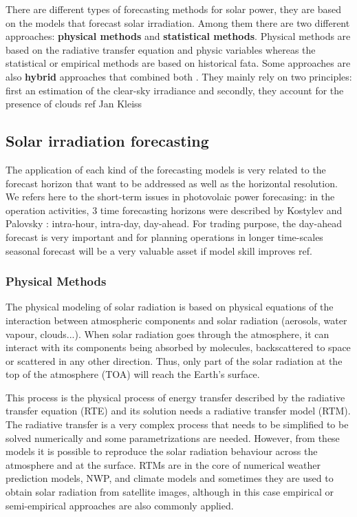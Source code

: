 There are different types of forecasting methods for solar power, they are based on the models that forecast solar irradiation. Among them there are two different approaches: \textbf{physical methods} and \textbf{statistical methods}. Physical methods are based on the radiative transfer equation and physic variables whereas the statistical or empirical methods are based on historical fata. Some approaches are also \textbf{hybrid} approaches that combined both \cite*{Diagne2013, Tovar-Pescador2008}. They mainly rely on two principles: first an estimation of the clear-sky irradiance and secondly, they account for the presence of clouds {ref Jan Kleiss}  


\subsection{Solar irradiation forecasting}

The application of each kind of the forecasting models is very related to the forecast horizon that want to be addressed as well as the horizontal resolution. We refers here to the short-term issues in photovolaic power forecasing: in the operation activities, 3 time forecasting horizons were described by Kostylev and Palovsky \cite*{kostylev2011solar}: intra-hour, intra-day, day-ahead. For trading purpose, the day-ahead forecast is very important and for planning operations in longer time-scales seasonal forecast will be a very valuable asset if model skill improves {ref}. 

\subsubsection{Physical Methods}

The physical modeling of solar radiation is based on physical equations of the interaction between atmospheric components and solar radiation (aerosols, water vapour, clouds...). When solar radiation goes through the atmosphere, it can interact with its components being absorbed by molecules, backscattered to space or scattered in any other direction. Thus, only part of the solar radiation at the top of the atmosphere (TOA) will reach the Earth's surface.

This process is the physical process of energy transfer described by the radiative transfer equation (RTE) and its solution needs a radiative transfer model (RTM). The radiative transfer is a very complex process that needs to be simplified to be solved numerically and some parametrizations are needed. However, from these models it is possible to reproduce the solar radiation behaviour across the atmosphere and at the surface. RTMs are in the core of numerical weather prediction models, NWP, and climate models and sometimes they are used to obtain solar radiation from satellite images, although in this case empirical or semi-empirical approaches are also commonly applied.

